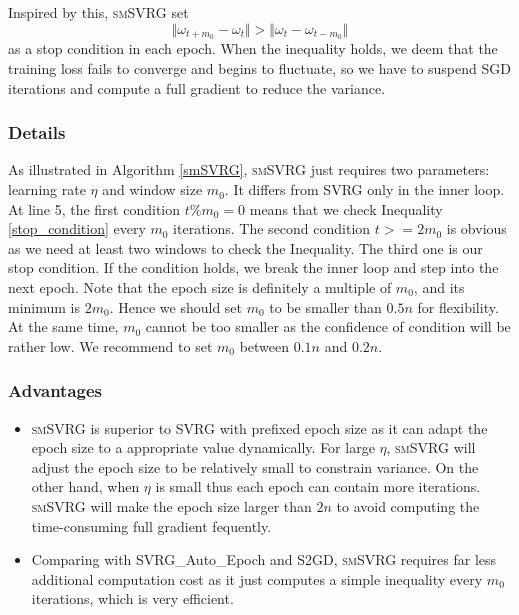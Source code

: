 \documentclass[conference]{IEEEtran}
\begin{document}
 Inspired by this, \textsc{smSVRG}  set 
 \begin{equation}
 \label{stop_condition}
 \Vert\omega_{t+m_0}-\omega_t\Vert>\Vert\omega_{t}-\omega_{t-m_0}\Vert
 \end{equation}
 as a stop condition in each epoch. When the inequality holds, we deem that the training loss fails to converge and begins to fluctuate, so we have to suspend SGD iterations and compute a full gradient to reduce the variance.
 
\subsubsection{Details}
As illustrated in Algorithm \ref{smSVRG}, \textsc{smSVRG} just requires two parameters: learning rate $\eta$ and window size $m_0$. It differs from SVRG only in the inner loop. At line 5, the first condition $t\%m_0=0$ means that  we check Inequality \ref{stop_condition} every $m_0$ iterations. The second condition $t>=2m_0$ is obvious as we need at least two windows to check the Inequality. The third one is our stop condition. If the condition holds, we break the inner loop and step into the next epoch. Note that the epoch size is definitely a multiple of $m_0$, and its minimum is $2m_0$. Hence we should set $m_0$ to be smaller than $0.5n$ for flexibility. At the same time, $m_0$ cannot be too smaller as the confidence of condition will be rather low. We recommend to set $m_0$ between $0.1n$ and $0.2n$.

\subsubsection{Advantages}
\begin{itemize}
\item \textsc{smSVRG} is superior to SVRG with prefixed epoch size as it can adapt the epoch size to a appropriate value dynamically. For large $\eta$, \textsc{smSVRG} will adjust the epoch size to be relatively small to constrain variance. On the other hand, when $\eta$ is small thus each epoch can contain more iterations. \textsc{smSVRG} will make the epoch size larger than $2n$ to avoid computing the time-consuming full gradient fequently.
\item Comparing with SVRG\_Auto\_Epoch and S2GD, \textsc{smSVRG} requires far less additional computation cost as it just computes a simple inequality every $m_0$ iterations, which is very efficient.
\end{itemize}
 
\end{document}
